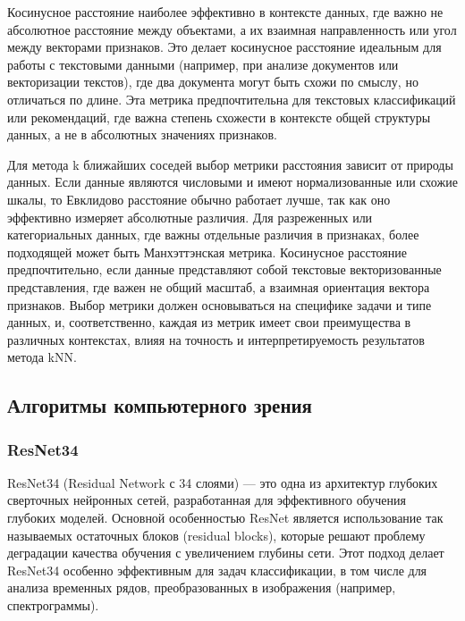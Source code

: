 \documentclass[spec, och, diploma]{SCWorks}
\begin{document}
            Косинусное расстояние наиболее эффективно в контексте данных, где
            важно не абсолютное расстояние между объектами, а их взаимная
            направленность или угол между векторами признаков. Это делает
            косинусное расстояние идеальным для работы с текстовыми данными
            (например, при анализе документов или векторизации текстов), где два
            документа могут быть схожи по смыслу, но отличаться по длине. Эта
            метрика предпочтительна для текстовых классификаций или
            рекомендаций, где важна степень схожести в контексте общей структуры
            данных, а не в абсолютных значениях признаков.

            Для метода k ближайших соседей выбор метрики расстояния зависит от
            природы данных. Если данные являются числовыми и имеют
            нормализованные или схожие шкалы, то Евклидово расстояние обычно
            работает лучше, так как оно эффективно измеряет абсолютные различия.
            Для разреженных или категориальных данных, где важны отдельные
            различия в признаках, более подходящей может быть Манхэттэнская
            метрика. Косинусное расстояние предпочтительно, если данные
            представляют собой текстовые векторизованные представления, где
            важен не общий масштаб, а взаимная ориентация вектора признаков.
            Выбор метрики должен основываться на специфике задачи и типе данных,
            и, соответственно, каждая из метрик имеет свои преимущества в
            различных контекстах, влияя на точность и интерпретируемость
            результатов метода kNN.

    \subsection{Алгоритмы компьютерного зрения}

        \subsubsection{ResNet34}

            ResNet34 (Residual Network с 34 слоями) — это одна из архитектур
            глубоких сверточных нейронных сетей, разработанная для эффективного
            обучения глубоких моделей. Основной особенностью ResNet является
            использование так называемых остаточных блоков (residual blocks),
            которые решают проблему деградации качества обучения с увеличением
            глубины сети. Этот подход делает ResNet34 особенно эффективным для
            задач классификации, в том числе для анализа временных рядов,
            преобразованных в изображения (например, спектрограммы).
            \cite{resnet}
\end{document}
